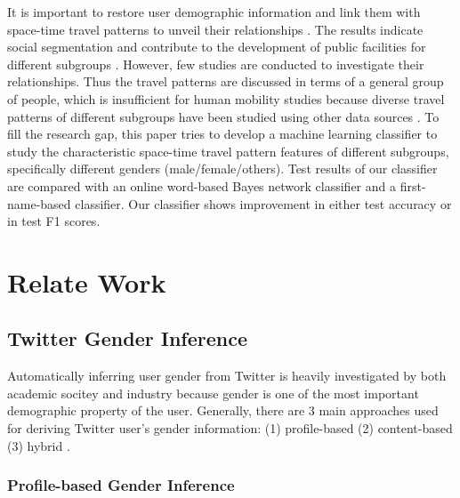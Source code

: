 \documentclass{article}
\begin{document}
It is important to restore user demographic information and link them with space-time travel patterns to unveil their relationships \cite{ahn2016gender}. The results indicate social segmentation and contribute to the development of public facilities for different subgroups \cite{kang2010analyzing}. However, few studies are conducted to investigate their relationships. Thus the travel patterns are discussed in terms of a general group of people, which is insufficient for human mobility studies because diverse travel patterns of different subgroups have been studied using other data sources \cite{kang2010analyzing}. To fill the research gap, this paper tries to develop a machine learning classifier to study the characteristic space-time travel pattern features of different subgroups, specifically different genders (male/female/others). Test results of our classifier are compared with an online word-based Bayes network classifier and a first-name-based classifier. Our classifier shows improvement in either test accuracy or in test F1 scores.  

\section{Relate Work}

\subsection{Twitter Gender Inference}
Automatically inferring user gender from Twitter is heavily investigated by both academic socitey and industry because gender is one of the most important demographic property of the user.  Generally, there are 3 main approaches used for deriving Twitter user’s gender information: (1) profile-based (2) content-based (3) hybrid \cite{beretta2015interactive}.

\subsubsection{Profile-based Gender Inference}
\end{document}
